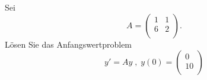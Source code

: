 \vspace{1cm}

\subsubsection{} %

Sei \[ A = \begin{pmatrix} 1 & 1 \\ 6 & 2 \\ \end{pmatrix}. \] Lösen Sie das Anfangswertproblem \[ y'=Ay \;, \; y(0)= \begin{pmatrix} 0 \\ 10 \\ \end{pmatrix} \]

\vspace{1\baselineskip}

